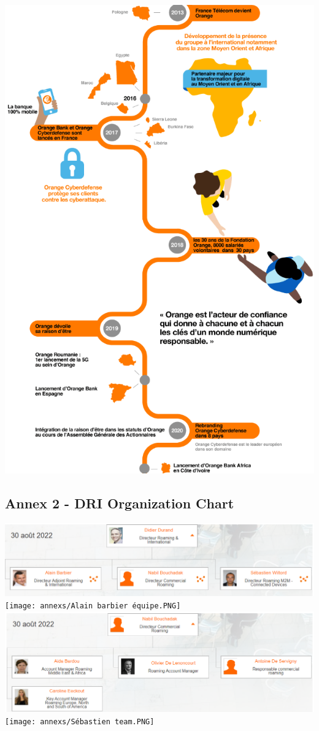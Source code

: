 \includegraphics[scale=0.9]{annexs/Capture1.PNG}

\subsection*{Annex 2 - DRI Organization Chart}
\begin{center}
\includegraphics[scale=0.71]{annexs/Direction roaming et international.PNG}
\texttt{[image: annexs/Alain barbier équipe.PNG]}
\includegraphics[scale=0.71]{annexs/commerciale team .PNG}
\texttt{[image: annexs/Sébastien team.PNG]}
\end{center}

